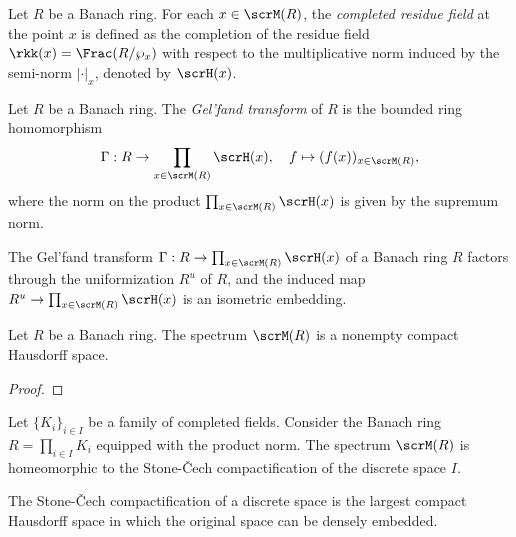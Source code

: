     \begin{definition}
        Let \(R\) be a Banach ring.
        For each \(x \in \scrM(R)\), the \emph{completed residue field} at the point \(x\) is defined as the completion of the residue field \(\rkk(x) = \Frac(R/\wp_x)\) with respect to the multiplicative norm induced by the semi-norm \(|\cdot|_x\), denoted by \(\scrH(x)\).
    \end{definition}

    \begin{definition}\label{def:Gelfand_transform_of_banach_rings}
        Let \(R\) be a Banach ring.
        The \emph{Gel'fand transform} of \(R\) is the bounded ring homomorphism
        \[
            \Gamma: R \to \prod_{x \in \scrM(R)} \scrH(x), \quad f \mapsto (f(x))_{x \in \scrM(R)},
        \]
        where the norm on the product \(\prod_{x \in \scrM(R)} \scrH(x)\) is given by the supremum norm.
    \end{definition}

    \begin{proposition}\label{prop:Gelfand_transform_and_the_uniformization_of_a_banach_ring}
        The Gel'fand transform \(\Gamma: R \to \prod_{x \in \scrM(R)} \scrH(x)\) of a Banach ring \(R\) factors through the uniformization \(R^u\) of \(R\), and the induced map \(R^u \to \prod_{x \in \scrM(R)} \scrH(x)\) is an isometric embedding.
    \end{proposition}

    \begin{theorem}\label{thm:spectrum_of_Banach_rings_is_nonempty_compact_Hausdorff}
        Let \(R\) be a Banach ring.
        The spectrum \(\scrM(R)\) is a nonempty compact Hausdorff space.
    \end{theorem}
    \begin{proof}
    \end{proof}

    \begin{lemma}\label{lem:spectrum_of_product_of_completed_fields}
        Let \(\{K_i\}_{i \in I}\) be a family of completed fields.
        Consider the Banach ring \(R = \prod_{i \in I} K_i\) equipped with the product norm.
        The spectrum \(\scrM(R)\) is homeomorphic to the Stone-\v{C}ech compactification of the discrete space \(I\).
    \end{lemma}

    \begin{remark}\label{rmk:some_fact_about_the_Stone_Cech_compactification}
        The Stone-\v{C}ech compactification of a discrete space is the largest compact Hausdorff space in which the original space can be densely embedded.
    \end{remark}

